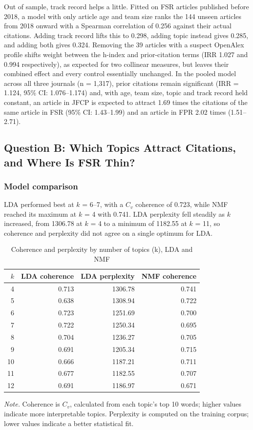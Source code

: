 \documentclass[11pt,a4paper]{article}
\newcommand{\tablenote}[1]{\par\smallskip\parbox{\linewidth}{\footnotesize\textit{Note.} #1}}
\begin{document}
Out of sample, track record helps a little. Fitted on FSR articles published before 2018, a model with only article age and team size ranks the 144 unseen articles from 2018 onward with a Spearman correlation of 0.256 against their actual citations. Adding track record lifts this to 0.298, adding topic instead gives 0.285, and adding both gives 0.324. Removing the 39 articles with a suspect OpenAlex profile shifts weight between the h-index and prior-citation terms (IRR 1.027 and 0.994 respectively), as expected for two collinear measures, but leaves their combined effect and every control essentially unchanged. In the pooled model across all three journals (n = 1,317), prior citations remain significant (IRR = 1.124, 95\% CI: 1.076--1.174) and, with age, team size, topic and track record held constant, an article in JFCP is expected to attract 1.69 times the citations of the same article in FSR (95\% CI: 1.43--1.99) and an article in FPR 2.02 times (1.51--2.71).

\subsection{Question B: Which Topics Attract Citations, and Where Is FSR Thin?}\label{question-b-which-topics-attract-citations}

\subsubsection{Model comparison}\label{qb-model-comparison}

LDA performed best at \(k\) = 6--7, with a \(C_v\) coherence of 0.723, while NMF reached its maximum at \(k\) = 4 with 0.741. LDA perplexity fell steadily as \(k\) increased, from 1306.78 at \(k\) = 4 to a minimum of 1182.55 at \(k\) = 11, so coherence and perplexity did not agree on a single optimum for LDA.

\begin{table}[htbp]
\centering
\small
\caption{Coherence and perplexity by number of topics (k), LDA and NMF}
\label{tab:qb_k}
\begin{tabular}{rrrr}
\toprule
$k$ & LDA coherence & LDA perplexity & NMF coherence \\
\midrule
4 & 0.713 & 1306.78 & 0.741 \\
5 & 0.638 & 1308.94 & 0.722 \\
6 & 0.723 & 1251.69 & 0.700 \\
7 & 0.722 & 1250.34 & 0.695 \\
8 & 0.704 & 1236.27 & 0.705 \\
9 & 0.691 & 1205.34 & 0.715 \\
10 & 0.666 & 1187.21 & 0.711 \\
11 & 0.677 & 1182.55 & 0.707 \\
12 & 0.691 & 1186.97 & 0.671 \\
\bottomrule
\end{tabular}
\tablenote{Coherence is $C_v$, calculated from each topic's top 10 words; higher values indicate more interpretable topics. Perplexity is computed on the training corpus; lower values indicate a better statistical fit.}
\end{table}
\end{document}
